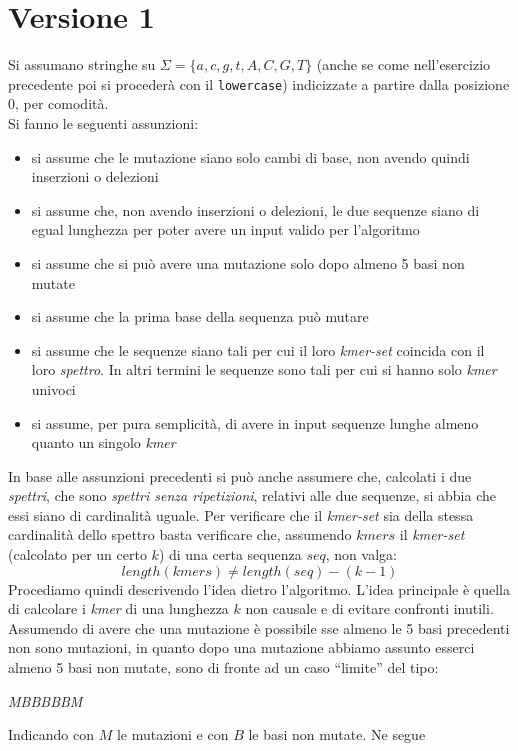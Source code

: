\documentclass[a4paper,12pt, oneside]{book}
\begin{document}
\section{Versione 1}
Si assumano stringhe su $\Sigma=\{a,c,g,t,A,C,G,T\}$ (anche se come
nell'esercizio precedente poi si procederà con il \texttt{lowercase})
indicizzate a partire dalla posizione 0, per comodità.\\
Si fanno le seguenti assunzioni:
\begin{itemize}
  \item si assume che le mutazione siano solo cambi di base, non avendo quindi
  inserzioni o delezioni
  \item si assume che, non avendo inserzioni o delezioni, le due sequenze siano
  di egual lunghezza per poter avere un input valido per l'algoritmo
  \item si assume che si può avere una mutazione solo dopo almeno 5 basi non
  mutate 
  \item si assume che la prima base della sequenza può mutare
  \item si assume che le sequenze siano tali per cui il loro \textit{kmer-set}
  coincida con il loro \textit{spettro}. In altri termini le sequenze sono tali
  per cui si hanno solo \textit{kmer} univoci
  \item si assume, per pura semplicità, di avere in input sequenze lunghe almeno
  quanto un singolo \textit{kmer}
\end{itemize}
In base alle assunzioni precedenti si può anche assumere che, calcolati i due
\textit{spettri}, che sono \textit{spettri senza ripetizioni}, relativi alle due
sequenze, si abbia che essi siano di cardinalità uguale. Per verificare che il
\textit{kmer-set} sia della stessa cardinalità dello spettro basta verificare
che, assumendo $kmers$ il \textit{kmer-set} (calcolato per un certo $k$) di una
certa sequenza $seq$, non valga: 
\[length(kmers) \neq length(seq)-(k-1)\]
Procediamo quindi descrivendo l'idea dietro l'algoritmo. L'idea principale è
quella di calcolare i \textit{kmer} di una lunghezza $k$ non causale e di
evitare confronti inutili. Assumendo di avere che una mutazione è possibile sse
almeno le 5 basi precedenti non sono mutazioni, in quanto dopo una mutazione
abbiamo assunto esserci almeno 5 basi non mutate, sono di fronte ad un caso
``limite'' del tipo:
\begin{center}
  \textit{{\color{red}M}BBBBB{\color{red}M}}
\end{center}
Indicando con $M$ le mutazioni e con $B$ le basi non mutate. Ne segue
\end{document}

